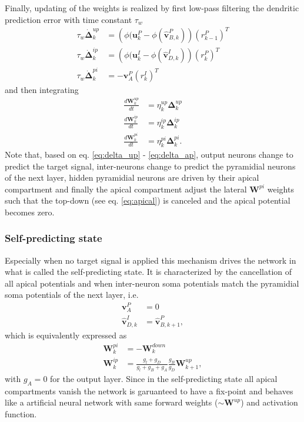 \documentclass[12pt,a4paper]{article}
\begin{document}
Finally, updating of the weights is realized by first low-pass filtering the dendritic prediction error with time constant $\tau_w$
\begin{align}
\tau_w\dot{\bm{\Delta}}^{up}_k &= \left(\phi(\bm{u}^P_k - \phi(\hat{\bm{v}}^P_{B,k})\right)(r^P_{k-1})^T\label{eq:delta_up}\\
\tau_w\dot{\bm{\Delta}}^{ip}_k &= \left(\phi(\bm{u}^I_k - \phi(\hat{\bm{v}}^I_{D,k})\right)(r^P_{k})^T\\
\tau_w\dot{\bm{\Delta}}^{pi}_k &= -\bm{v}^P_A(r^I_{k})^T \label{eq:delta_ap}
\end{align}
and then integrating
\begin{align}
\frac{d\bm{W}^{up}_k}{dt} &= \eta^{up}_k\bm{\Delta}^{up}_k \\
\frac{d\bm{W}^{ip}_k}{dt} &= \eta^{ip}_k\bm{\Delta}^{ip}_k \\
\frac{d\bm{W}^{pi}_k}{dt} &= \eta^{pi}_k\bm{\Delta}^{pi}_k. \label{eq:W_pi}
\end{align}
Note that, based on eq. \eqref{eq:delta_up} - \eqref{eq:delta_ap}, output neurons change to predict the target signal, inter-neurons change to predict the pyramidial neurons of the next layer, hidden pyramidial neurons are driven by their apical compartment and finally the apical compartment adjust the lateral $\bm{W}^{pi}$ weights such that the top-down (see eq. \eqref{eq:apical}) is canceled and the apical potential becomes zero.\\

\subsubsection{Self-predicting state}
Especially when no target signal is applied this mechanism drives the network in what is called the self-predicting state. It is characterized by the cancellation of all apical potentials and when inter-neuron soma potentials match the pyramidial soma potentials of the next layer, i.e.
\begin{align}
\bm{v}^P_A &= 0\\
\hat{\bm{v}}^I_{D,k} &= \hat{\bm{v}}^P_{B,k+1},
\end{align} 
which is equivalently expressed as 
\begin{align}
\bm{W}^{pi}_k &= - \bm{W}^{down}_k \label{eq:sps_pi} \\
\bm{W}^{ip}_k &= \frac{g_l + g_D}{g_l + g_B + g_A}\frac{g_B}{g_D}\bm{W}^{up}_{k+1}, \label{eq:sps_ip}
\end{align}
with $g_A = 0$ for the output layer. Since in the self-predicting state all apical compartments vanish the network is garuanteed to have a fix-point and behaves like a artificial neural network with same forward weights ($\sim \bm{W}^{up}$) and activation function. 
\end{document}
